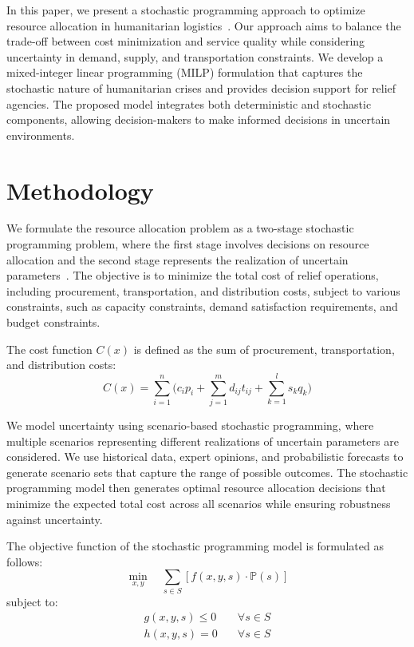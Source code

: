 \documentclass[opre,sglanonrev]{informs4}
\begin{document}
In this paper, we present a stochastic programming approach to optimize resource allocation in humanitarian logistics~\citep{jones2010}. Our approach aims to balance the trade-off between cost minimization and service quality while considering uncertainty in demand, supply, and transportation constraints. We develop a mixed-integer linear programming (MILP) formulation that captures the stochastic nature of humanitarian crises and provides decision support for relief agencies. The proposed model integrates both deterministic and stochastic components, allowing decision-makers to make informed decisions in uncertain environments.

\section{Methodology}\label{sec:Method}
We formulate the resource allocation problem as a two-stage stochastic programming problem, where the first stage involves decisions on resource allocation and the second stage represents the realization of uncertain parameters~\citep{smith2005,jones2010,brown2015}. The objective is to minimize the total cost of relief operations, including procurement, transportation, and distribution costs, subject to various constraints, such as capacity constraints, demand satisfaction requirements, and budget constraints.

The cost function $C(x)$ is defined as the sum of procurement, transportation, and distribution costs:
\begin{equation}
C(x) = \sum_{i=1}^{n} \Biggl(c_i p_i + \sum_{j=1}^{m} d_{ij} t_{ij} + \sum_{k=1}^{l} s_k q_k\Biggr)
\end{equation}

We model uncertainty using scenario-based stochastic programming, where multiple scenarios representing different realizations of uncertain parameters are considered. We use historical data, expert opinions, and probabilistic forecasts to generate scenario sets that capture the range of possible outcomes. The stochastic programming model then generates optimal resource allocation decisions that minimize the expected total cost across all scenarios while ensuring robustness against uncertainty.

The objective function of the stochastic programming model is formulated as follows:
\begin{equation*}
\min_{x,y} \quad \sum_{s \in S} \left[ f(x, y, s) \cdot \mathbb{P}(s) \right]
\end{equation*}
subject to:
\begin{align}
g(x, y, s) \leq 0 &\quad \forall s \in S\\
h(x, y, s) = 0 &\quad \forall s \in S
\end{align}
\end{document}

